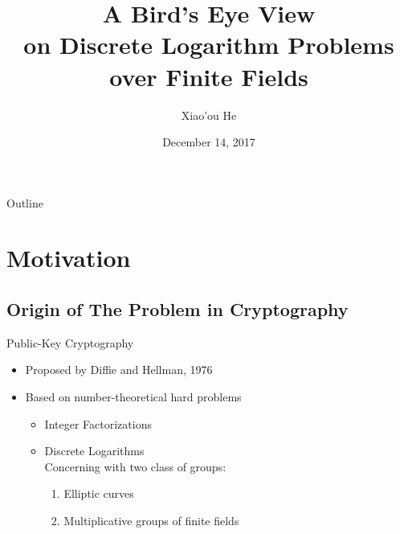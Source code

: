 \documentclass{beamer}
\title[Short Paper Title]
{A Bird's Eye View\\on Discrete Logarithm Problems\\over Finite Fields}
\author[He]
{Xiao'ou He}
\institute[Universities of Somewhere and Elsewhere]
{Key Laboratory of Mathematics Mechanization, AMSS}
\date[Annual 2017]
{December 14, 2017}
\begin{document}
\begin{frame}
  \titlepage
\end{frame}

\begin{frame}{Outline}
  \tableofcontents[pausesections]
\end{frame}

\section{Motivation}

	\subsection{Origin of The Problem in Cryptography}
		\begin{frame}{Public-Key Cryptography}
			\begin{itemize}
				\item
					Proposed by Diffie and Hellman, 1976%
				\item
					Based on number-theoretical hard problems
					\begin{itemize}
						\item
							Integer Factorizations
						\item
							\alert{Discrete Logarithms}\\
							Concerning with two class of groups:
							\begin{enumerate}
								\item
									Elliptic curves
								\item
									\alert{Multiplicative groups of finite fields}
							\end{enumerate}
					\end{itemize}
			\end{itemize}
		\end{frame}
\end{document}
